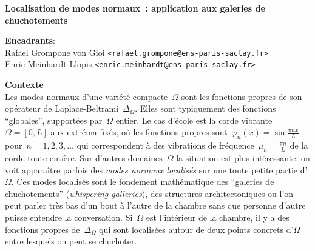 \documentclass[a4paper,11pt]{article}
\begin{document}
\thispagestyle{empty}

{\bf
	Localisation de modes normaux~:
	application aux galeries de chuchotements
}

{\bf Encadrants}:\\
Rafael Grompone von Gioi \verb+<rafael.grompone@ens-paris-saclay.fr>+\\
Enric Meinhardt-Llopis \verb+<enric.meinhardt@ens-paris-saclay.fr>+ 

{\bf Contexte}\\
Les modes normaux d'une variété compacte~$\Omega$ sont les fonctions propres de
son opérateur de Laplace-Beltrami~$\Delta_\Omega$.  Elles sont typiquement des
fonctions ``globales'', supportées par~$\Omega$ entier.  Le cas d'école est la
corde vibrante~$\Omega=[0,L]$ aux extréma fixés, où les
fonctions propres sont~$\varphi_n(x)=\sin\frac{\pi n x}L$
pour~$n=1,2,3,\ldots$ qui correspondent à des vibrations
de fréquence~$\mu_n=\frac{\pi n}L$ de la corde toute entière.  Sur d'autres
domaines~$\Omega$ la situation est plus intéressante: on voit apparaître
parfois des \emph{modes normaux localisés} sur une toute petite partie
d'$\Omega$.
Ces modes localisés sont le fondement mathématique des ``galeries de
chuchotements'' (\emph{whispering galleries}), des structures architectoniques
ou l'on peut parler très bas d'un bout à l'autre de la chambre sans que
personne d'autre puisse entendre la conversation.  Si~$\Omega$ est l'intérieur
de la chambre, il y a des fonctions propres de~$\Delta_\Omega$ qui sont
localisées autour de deux points concrets d'$\Omega$ entre lesquels on peut se
chuchoter.

\end{document}
